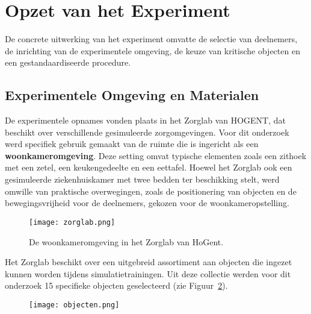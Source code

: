 \section{Opzet van het Experiment}

De concrete uitwerking van het experiment omvatte de selectie van deelnemers, de inrichting van de experimentele omgeving, de keuze van kritische objecten en een gestandaardiseerde procedure.

\subsection{Experimentele Omgeving en Materialen}

De experimentele opnames vonden plaats in het Zorglab van HOGENT, dat beschikt over verschillende gesimuleerde zorgomgevingen. 
Voor dit onderzoek werd specifiek gebruik gemaakt van de ruimte die is ingericht als een \textbf{woonkameromgeving}. 
Deze setting omvat typische elementen zoals een zithoek met een zetel, een keukengedeelte en een eettafel. 
Hoewel het Zorglab ook een gesimuleerde ziekenhuiskamer met twee bedden ter beschikking stelt, werd omwille van praktische overwegingen, 
zoals de positionering van objecten en de bewegingsvrijheid voor de deelnemers, gekozen voor de woonkameropstelling.

\begin{figure}[H]
  \centering
  \texttt{[image: zorglab.png]}
  \caption[]{\label{fig:zorglab} De woonkameromgeving in het Zorglab van HoGent.}
\end{figure}

Het Zorglab beschikt over een uitgebreid assortiment aan objecten die ingezet kunnen worden tijdens simulatietrainingen. 
Uit deze collectie werden voor dit onderzoek 15 specifieke objecten geselecteerd (zie Figuur~\ref{fig:objecten_experiment}). 

\begin{figure}[H]
  \centering
  \texttt{[image: objecten.png]}
  \caption[]{\label{fig:objecten_experiment} }
\end{figure}

